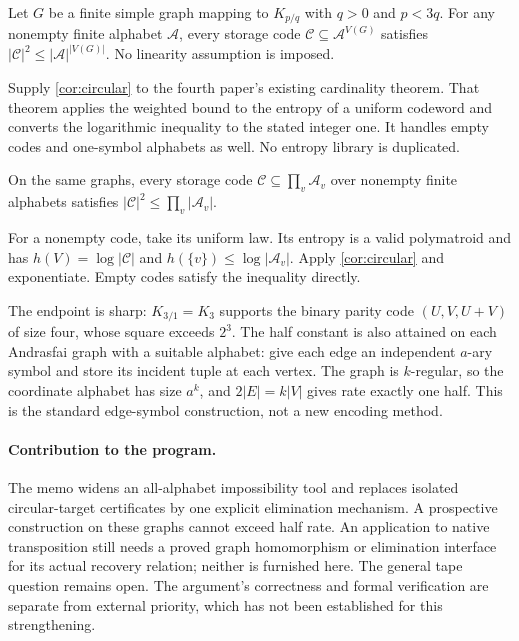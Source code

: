 \begin{corollary}\label{cor:codes}
Let $G$ be a finite simple graph mapping to $K_{p/q}$ with $q>0$
and $p<3q$. For any nonempty finite alphabet $\mathcal A$, every
storage code $\mathcal C\subseteq\mathcal A^{V(G)}$ satisfies
$|\mathcal C|^2\le|\mathcal A|^{|V(G)|}$.
No linearity assumption is imposed.
\end{corollary}
\begin{outline}
Supply \cref{cor:circular} to the fourth paper's existing
cardinality theorem. That theorem applies the
weighted bound to the entropy of a uniform codeword and converts the
logarithmic inequality to the stated integer one. It handles empty
codes and one-symbol alphabets as well. No entropy library is duplicated.
\end{outline}

\begin{corollary}\label{cor:unequal}
\notformalized
On the same graphs, every storage code
$\mathcal C\subseteq\prod_v\mathcal A_v$ over nonempty finite
alphabets satisfies $|\mathcal C|^2\le\prod_v|\mathcal A_v|$.
\end{corollary}
\begin{informalproof}
For a nonempty code, take its uniform law. Its entropy is a valid
polymatroid and has $h(V)=\log|\mathcal C|$ and
$h(\{v\})\le\log|\mathcal A_v|$. Apply \cref{cor:circular} and
exponentiate. Empty codes satisfy the inequality directly.
\end{informalproof}

The endpoint is sharp: $K_{3/1}=K_3$ supports the binary parity code
$(U,V,U+V)$ of size four, whose square exceeds $2^3$.
The half constant is also attained on each Andrasfai graph with a
suitable alphabet: give each edge an independent $a$-ary symbol and
store its incident tuple at each vertex. The graph is $k$-regular,
so the coordinate alphabet has size $a^k$, and
$2|E|=k|V|$ gives rate exactly one half. This is the standard edge-symbol
construction, not a new encoding method.

\paragraph{Contribution to the program.}
The memo widens an all-alphabet impossibility tool and replaces isolated
circular-target certificates by one explicit elimination mechanism.
A prospective construction on these graphs cannot exceed half rate.
An application to native transposition still needs a proved graph
homomorphism or elimination interface for its actual recovery relation;
neither is furnished here. The general tape question remains open.
The argument's correctness and formal verification are separate from
external priority, which has not been established for this strengthening.
